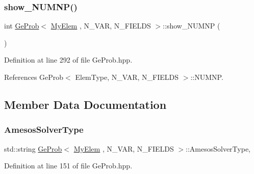 \mbox{\label{classGeProb_a9470702789ccb98b8c952d3259bcba7f}} 
\subsubsection{\texorpdfstring{show\+\_\+\+N\+U\+M\+N\+P()}{show\_NUMNP()}}
{\footnotesize\ttfamily int \hyperlink{classGeProb}{Ge\+Prob}$<$ \hyperlink{DG__Prob_8h_a83cd887ced9a6587428f267e50cd4787}{My\+Elem} , N\+\_\+\+V\+AR, N\+\_\+\+F\+I\+E\+L\+DS $>$\+::show\+\_\+\+N\+U\+M\+NP (\begin{DoxyParamCaption}{ }\end{DoxyParamCaption})\hspace{0.3cm}{\ttfamily [inherited]}}



Definition at line 292 of file Ge\+Prob.\+hpp.



References Ge\+Prob$<$ Elem\+Type, N\+\_\+\+V\+A\+R, N\+\_\+\+F\+I\+E\+L\+D\+S $>$\+::\+N\+U\+M\+NP.



\subsection{Member Data Documentation}
\mbox{\label{classGeProb_a000f412eadf9ce5cf4f5391012283330}} 
\subsubsection{\texorpdfstring{Amesos\+Solver\+Type}{AmesosSolverType}}
{\footnotesize\ttfamily std\+::string \hyperlink{classGeProb}{Ge\+Prob}$<$ \hyperlink{DG__Prob_8h_a83cd887ced9a6587428f267e50cd4787}{My\+Elem} , N\+\_\+\+V\+AR, N\+\_\+\+F\+I\+E\+L\+DS $>$\+::Amesos\+Solver\+Type\hspace{0.3cm}{\ttfamily [protected]}, {\ttfamily [inherited]}}



Definition at line 151 of file Ge\+Prob.\+hpp.



